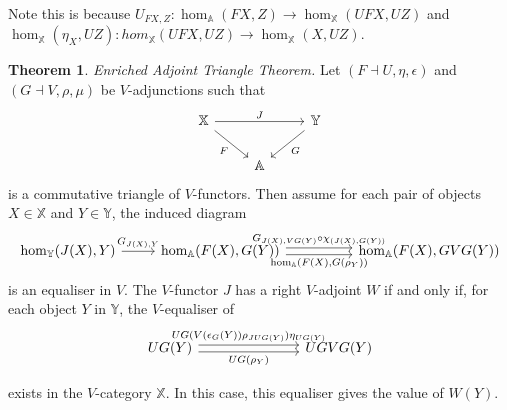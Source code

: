 \documentclass{article}
\numberwithin{equation}{section}
\theoremstyle{definition}
\newtheorem{thm}{Theorem}[section]
\theoremstyle{definition}
\theoremstyle{remark}
\theoremstyle{remark}
\begin{document}
		Note this is because $ U_{FX,Z}: \hom_{ \mathbb{A}}(FX,Z) \longrightarrow \hom_{ \mathbb{X}}(UFX, UZ) $ and $ \hom _{ \mathbb{X}}(\eta_X, UZ): hom_{ \mathbb{X}}(UFX, UZ) \longrightarrow \hom _{ \mathbb{X}}(X, UZ)$.

	\begin{thm}\label{thm:enrichedadjoint}
		\textit{Enriched Adjoint Triangle Theorem.} Let $ (F \dashv U, \eta, \epsilon)$ and $ (G \dashv V, \rho, \mu)$ be $ V$-adjunctions such that 		
		\[\begin{tikzcd}
			{\mathbb{X}} && {\mathbb{Y}} \\
			& {\mathbb{A}}
			\arrow["J", from=1-1, to=1-3]
			\arrow["F"', from=1-1, to=2-2]
			\arrow["G", from=1-3, to=2-2]
		\end{tikzcd}\]	
		is a commutative triangle of $V$-functors. Then assume for each pair of objects $ X \in \mathbb{X}$ and $ Y \in \mathbb{Y}$, the induced diagram 
		\[\begin{tikzcd}
			{\hom_{\mathbb{Y}}(J(X),Y)} & {\hom_{\mathbb{A}}(F(X),G(Y))} && {\hom_{\mathbb{A}}(F(X), GVG(Y))}
			\arrow["{G_{J(X),Y}}", from=1-1, to=1-2]
			\arrow["{G_{J(X),VG(Y)}\circ \chi_{(J(X), G(Y))}}", shift left, from=1-2, to=1-4]
			\arrow["{\hom_{\mathbb{A}}(F(X),G(\rho_Y))}"', shift right, from=1-2, to=1-4]
		\end{tikzcd}\]
		is an equaliser in $ V$. The $ V$-functor $J$ has a right $V$-adjoint $W$ if and only if, for each object $ Y$ in $ \mathbb{Y}$, the $V$-equaliser of 
		\[\begin{tikzcd}
			{UG(Y)} &&& {UGVG(Y)}
			\arrow["{UG(V(\epsilon_G(Y))\rho_{JUG(Y)})\eta_{UG(Y)}}", shift left, from=1-1, to=1-4]
			\arrow["{UG(\rho_Y)}"', shift right, from=1-1, to=1-4]
		\end{tikzcd}\]	

		exists in the $V$-category $ \mathbb{X}$. In this case, this equaliser gives the value of $ W(Y)$.

	\end{thm} \\
				
\end{document}
